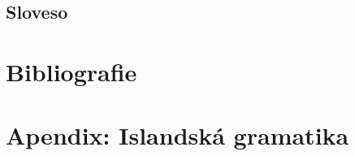 \begin{landscape}
\section{Sloveso}                                \label{sec:morpho_v}
{\small{}}
\end{landscape}

\clearpage

\fi


\ifmakebackmatter


\cleardoublepage
\label{sec:photo}
\printindex[figures]

\cleardoublepage
\chapter{Bibliografie}
\begin{multicols}{2}
\nocite{*}\printbibliography[heading=none]
\end{multicols}

\cleardoublepage
\onecolumn
\ifPDF
\else
\chapter{Apendix: Islandská gramatika}
\clearpage
\covergeometry  
\makeatletter

\makeatother
\restoregeometry  
\fi

